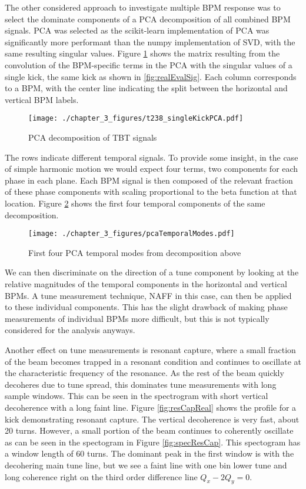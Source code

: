 The other considered approach to investigate multiple BPM response was to select the dominate components of a PCA decomposition of all combined BPM signals. PCA was selected as the scikit-learn implementation of PCA was significantly more performant than the numpy implementation of SVD, with the same resulting singular values. Figure \ref{fig:pcaComps} shows the matrix resulting from the convolution of the BPM-specific terms in the PCA with the singular values of a single kick, the same kick as shown in \ref{fig:realEvalSig}. Each column corresponds to a BPM, with the center line indicating the split between the horizontal and vertical BPM labels. 

\begin{figure}
	\centering
	\texttt{[image: ./chapter\_3\_figures/t238\_singleKickPCA.pdf]}
	\caption{PCA decomposition of TBT signals }
	\label{fig:pcaComps}
\end{figure}

The rows indicate different temporal signals. To provide some insight, in the case of simple harmonic motion we would expect four terms, two components for each phase in each plane. Each BPM signal is then composed of the relevant fraction of these phase components with scaling proportional to the beta function at that location. Figure \ref{fig:pcaTemps} shows the first four temporal components of the same decomposition. 

\begin{figure}
	\centering
	\texttt{[image: ./chapter\_3\_figures/pcaTemporalModes.pdf]}
	\caption{First four PCA temporal modes from decomposition above}
	\label{fig:pcaTemps}
\end{figure}

We can then discriminate on the direction of a tune component by looking at the relative magnitudes of the temporal components in the horizontal and vertical BPMs. A tune measurement technique, NAFF in this case, can then be applied to these individual components. This has the slight drawback of making phase measurements of individual BPMs more difficult, but this is not typically considered for the analysis anyways. 

Another effect on tune measurements is resonant capture, where a small fraction of the beam becomes trapped in a resonant condition and continues to oscillate at the characteristic frequency of the resonance. As the rest of the beam quickly decoheres due to tune spread, this dominates tune measurements with long sample windows. This can be seen in the spectrogram with short vertical decoherence with a long faint line. Figure \ref{fig:resCapReal} shows the profile for a kick demonstrating resonant capture. The vertical decoherence is very fast, about 20 turns. However, a small portion of the beam continues to coherently oscillate as can be seen in the spectogram in Figure \ref{fig:specResCap}. This spectogram has a window length of 60 turns. The dominant peak in the first window is with the decohering main tune line, but we see a faint line with one bin lower tune and long coherence right on the third order difference line $Q_x-2Q_y = 0$.

